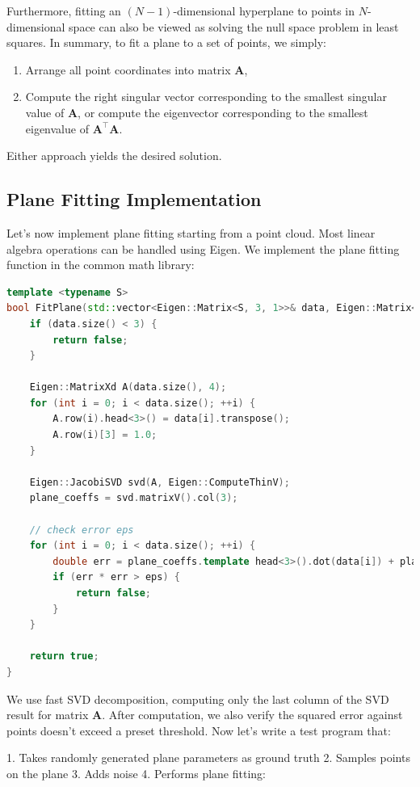 Furthermore, fitting an $(N-1)$-dimensional hyperplane to points in $N$-dimensional space can also be viewed as solving the null space problem in least squares. In summary, to fit a plane to a set of points, we simply:  

\begin{enumerate}
\item Arrange all point coordinates into matrix $\bm{A}$,  
\item Compute the right singular vector corresponding to the smallest singular value of $\bm{A}$, or compute the eigenvector corresponding to the smallest eigenvalue of $\bm{A}^\top \bm{A}$.  
\end{enumerate}

Either approach yields the desired solution.

\subsection{Plane Fitting Implementation}
Let's now implement plane fitting starting from a point cloud. Most linear algebra operations can be handled using Eigen. We implement the plane fitting function in the common math library:

\begin{lstlisting}[language=c++,caption=src/common/math\_utils.h]
template <typename S>
bool FitPlane(std::vector<Eigen::Matrix<S, 3, 1>>& data, Eigen::Matrix<S, 4, 1>& plane_coeffs, double eps = 1e-2) {
	if (data.size() < 3) {
		return false;
	}
	
	Eigen::MatrixXd A(data.size(), 4);
	for (int i = 0; i < data.size(); ++i) {
		A.row(i).head<3>() = data[i].transpose();
		A.row(i)[3] = 1.0;
	}
	
	Eigen::JacobiSVD svd(A, Eigen::ComputeThinV);
	plane_coeffs = svd.matrixV().col(3);
	
	// check error eps
	for (int i = 0; i < data.size(); ++i) {
		double err = plane_coeffs.template head<3>().dot(data[i]) + plane_coeffs[3];
		if (err * err > eps) {
			return false;
		}
	}
	
	return true;
}
\end{lstlisting}

We use fast SVD decomposition, computing only the last column of the SVD result for matrix $\bm{A}$. After computation, we also verify the squared error against points doesn't exceed a preset threshold. Now let's write a test program that:

1. Takes randomly generated plane parameters as ground truth
2. Samples points on the plane 
3. Adds noise
4. Performs plane fitting:


